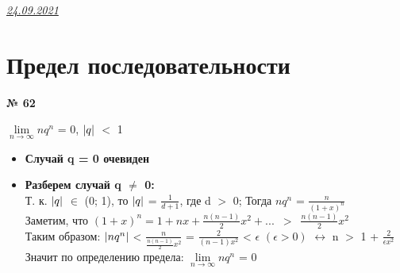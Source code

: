 \documentclass[12pt]{article}
\DeclarePairedDelimiter\abs{\lvert}{\rvert}%
\begin{document}
	{\hspace*{\fill} \underline{\textit{24.09.2021}}}
	\section{Предел последовательности}
	 \vspace{1cm}
	{
		{\textbf{№ 62}\\ \par}
		
		{\large $\lim\limits_{n \to \infty} n q^n$} = 0, \enspace $\abs{q}$ $<$ 1\\\par
		\begin{itemize}
			\item {
				\textbf{Случай q = 0 очевиден}
			}
			\item {
				\textbf{Разберем случай q $\neq$ 0:}\\
				Т. к. $\abs{q}$ $\in$ (0; 1), то  $\abs{q}$ = $\frac{1}{d + 1}$, где d $>$ 0;
				Тогда $n q^n$ = $\frac{n}{(1 + x)^n}$\vspace{.1cm}\\
				Заметим, что $(1 + x)^n=1+nx+\frac{n(n-1)}{2}x^2+... \enspace > \enspace \frac{n(n-1)}{2}x^2$\vspace{.1cm}\\
				Таким образом: $\abs{nq^n}$ < $\frac{n}{\frac{n(n-1)}{2}x^2}$ = $\frac{2}{(n-1)x^2}$ < $\epsilon$
				$(\epsilon > 0)$ $\leftrightarrow$ 
				n $>$ 1 + $\frac{2}{\epsilon x^2}$\\
				Значит по определению предела: $\lim\limits_{n \to \infty} n q^n$ = 0
			}
			
		\end{itemize}
	}
	
\end{document}
